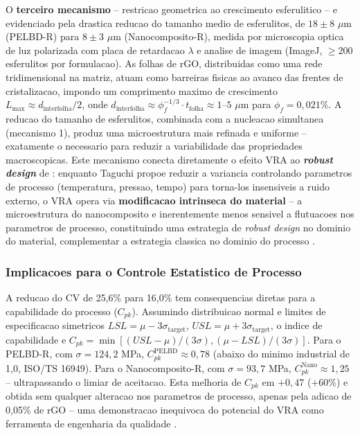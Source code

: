 \documentclass[11pt,a4paper,oneside]{article}
\begin{document}
O {\bfseries terceiro mecanismo} -- restricao geometrica ao crescimento esferulitico -- e evidenciado pela drastica reducao do tamanho medio de esferulitos, de $18{\pm}8$ $\mu$m (PELBD-R) para $8{\pm}3$ $\mu$m (Nanocomposito-R), medida por microscopia optica de luz polarizada com placa de retardacao $\lambda$ e analise de imagem (ImageJ, ${\ge}200$ esferulitos por formulacao). As folhas de rGO, distribuidas como uma rede tridimensional na matriz, atuam como barreiras fisicas ao avanco das frentes de cristalizacao, impondo um comprimento maximo de crescimento $L_{\max}{\approx}d_{\text{interfolha}}/2$, onde $d_{\text{interfolha}}{\approx}\phi_f^{-1/3}{\cdot}t_{\text{folha}}{\approx}1$--$5$ $\mu$m para $\phi_f{=}0{,}021\%$. A reducao do tamanho de esferulitos, combinada com a nucleacao simultanea (mecanismo 1), produz uma microestrutura mais refinada e uniforme -- exatamente o necessario para reduzir a variabilidade das propriedades macroscopicas. Este mecanismo conecta diretamente o efeito VRA ao {\bfseries \textit{robust design}} de \citet{Taguchi1986}: enquanto Taguchi propoe reduzir a variancia controlando parametros de processo (temperatura, pressao, tempo) para torna-los insensiveis a ruido externo, o VRA opera via {\bfseries modificacao intrinseca do material} -- a microestrutura do nanocomposito e inerentemente menos sensivel a flutuacoes nos parametros de processo, constituindo uma estrategia de \textit{robust design} no dominio do material, complementar a estrategia classica no dominio do processo \cite{Montgomery2020, Taguchi1986}.

\subsubsection{Implicacoes para o Controle Estatistico de Processo}

A reducao do CV de 25,6\% para 16,0\% tem consequencias diretas para a capabilidade do processo ($C_{pk}$). Assumindo distribuicao normal e limites de especificacao simetricos $LSL{=}\mu{-}3\sigma_{\text{target}}$, $USL{=}\mu{+}3\sigma_{\text{target}}$, o indice de capabilidade e $C_{pk}{=}\min[(USL{-}\mu)/(3\sigma), (\mu{-}LSL)/(3\sigma)]$. Para o PELBD-R, com $\sigma{=}124{,}2$ MPa, $C_{pk}^{\text{PELBD}}{\approx}0{,}78$ (abaixo do minimo industrial de 1,0, ISO/TS 16949). Para o Nanocomposito-R, com $\sigma{=}93{,}7$ MPa, $C_{pk}^{\text{Nano}}{\approx}1{,}25$ -- ultrapassando o limiar de aceitacao. Esta melhoria de $C_{pk}$ em $+0{,}47$ ($+60\%$) e obtida sem qualquer alteracao nos parametros de processo, apenas pela adicao de 0,05\% de rGO -- uma demonstracao inequivoca do potencial do VRA como ferramenta de engenharia da qualidade \cite{Montgomery2020}.
\end{document}
